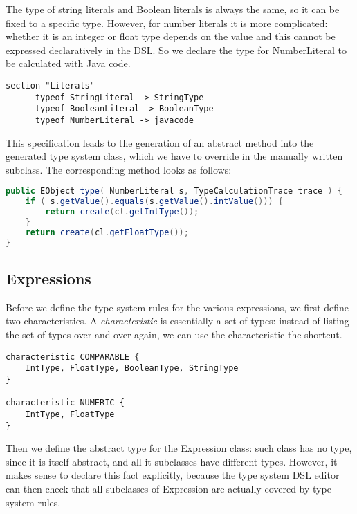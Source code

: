 The type of string literals and Boolean literals is always the same, so it can
be fixed to a specific type.
However, for number literals it is more complicated:
whether it is an integer or float type depends on the value and this cannot be
expressed declaratively in the DSL. So we declare the type for NumberLiteral to be calculated with Java
code.

\begin{lstlisting}[language=xts] 
section "Literals"
      typeof StringLiteral -> StringType
      typeof BooleanLiteral -> BooleanType
      typeof NumberLiteral -> javacode
\end{lstlisting}
 
This specification leads to the generation of an abstract method into the
generated type system class, which we have to override in the manually written
subclass. The corresponding method looks as follows:
 
\begin{lstlisting}[language=Java] 
public EObject type( NumberLiteral s, TypeCalculationTrace trace ) {
    if ( s.getValue().equals(s.getValue().intValue())) {
        return create(cl.getIntType());
    }
    return create(cl.getFloatType());
} 
\end{lstlisting}



\subsection{Expressions}

Before we define the type system rules for the various expressions,  we first
define two characteristics. A \emph{characteristic} is essentially a set of
types:
instead of listing the set of types over and over again, we can use the
characteristic the shortcut.

\begin{lstlisting}[language=xts] 
characteristic COMPARABLE {
    IntType, FloatType, BooleanType, StringType
}  
  
characteristic NUMERIC {
    IntType, FloatType
} 
\end{lstlisting}

Then we define the abstract type for the Expression class: such class
has no type, since it is itself abstract, and all it subclasses have different
types. However, it makes sense to declare this fact explicitly, because the type
system DSL editor can then check that all subclasses of Expression are actually
covered by type system rules.

